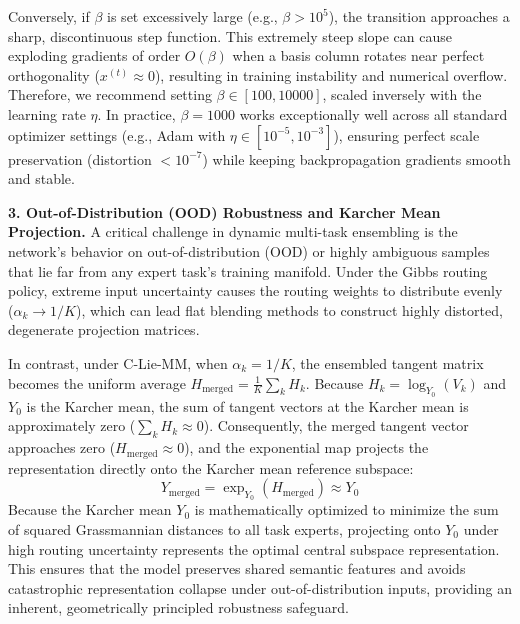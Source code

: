Conversely, if $\beta$ is set excessively large (e.g., $\beta > 10^5$), the transition approaches a sharp, discontinuous step function. This extremely steep slope can cause exploding gradients of order $O(\beta)$ when a basis column rotates near perfect orthogonality ($x^{(t)} \approx 0$), resulting in training instability and numerical overflow. Therefore, we recommend setting $\beta \in [100, 10000]$, scaled inversely with the learning rate $\eta$. In practice, $\beta = 1000$ works exceptionally well across all standard optimizer settings (e.g., Adam with $\eta \in [10^{-5}, 10^{-3}]$), ensuring perfect scale preservation (distortion $< 10^{-7}$) while keeping backpropagation gradients smooth and stable.

\textbf{3. Out-of-Distribution (OOD) Robustness and Karcher Mean Projection.}
A critical challenge in dynamic multi-task ensembling is the network's behavior on out-of-distribution (OOD) or highly ambiguous samples that lie far from any expert task's training manifold. Under the Gibbs routing policy, extreme input uncertainty causes the routing weights to distribute evenly ($\alpha_k \to 1/K$), which can lead flat blending methods to construct highly distorted, degenerate projection matrices.

In contrast, under C-Lie-MM, when $\alpha_k = 1/K$, the ensembled tangent matrix becomes the uniform average $H_{\text{merged}} = \frac{1}{K} \sum_k H_k$. Because $H_k = \log_{Y_0}(V_k)$ and $Y_0$ is the Karcher mean, the sum of tangent vectors at the Karcher mean is approximately zero ($\sum_k H_k \approx 0$). Consequently, the merged tangent vector approaches zero ($H_{\text{merged}} \approx 0$), and the exponential map projects the representation directly onto the Karcher mean reference subspace:
\begin{equation}
    Y_{\text{merged}} = \exp_{Y_0}(H_{\text{merged}}) \approx Y_0
\end{equation}
Because the Karcher mean $Y_0$ is mathematically optimized to minimize the sum of squared Grassmannian distances to all task experts, projecting onto $Y_0$ under high routing uncertainty represents the optimal central subspace representation. This ensures that the model preserves shared semantic features and avoids catastrophic representation collapse under out-of-distribution inputs, providing an inherent, geometrically principled robustness safeguard.

